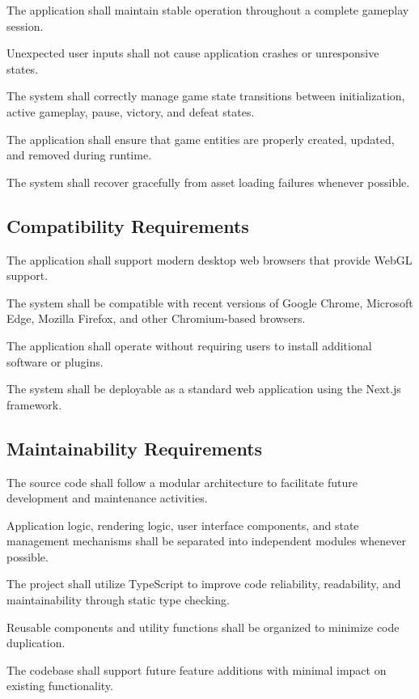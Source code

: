 \documentclass[11pt,a4paper]{article}
\begin{document}
The application shall maintain stable operation throughout a complete gameplay
session.

Unexpected user inputs shall not cause application crashes or unresponsive states.

The system shall correctly manage game state transitions between initialization,
active gameplay, pause, victory, and defeat states.

The application shall ensure that game entities are properly created, updated, and
removed during runtime.

The system shall recover gracefully from asset loading failures whenever possible.

\subsection{Compatibility Requirements}

The application shall support modern desktop web browsers that provide WebGL
support.

The system shall be compatible with recent versions of Google Chrome, Microsoft
Edge, Mozilla Firefox, and other Chromium-based browsers.

The application shall operate without requiring users to install additional
software or plugins.

The system shall be deployable as a standard web application using the Next.js
framework.

\subsection{Maintainability Requirements}

The source code shall follow a modular architecture to facilitate future
development and maintenance activities.

Application logic, rendering logic, user interface components, and state
management mechanisms shall be separated into independent modules whenever
possible.

The project shall utilize TypeScript to improve code reliability, readability, and
maintainability through static type checking.

Reusable components and utility functions shall be organized to minimize code
duplication.

The codebase shall support future feature additions with minimal impact on
existing functionality.

\end{document}

